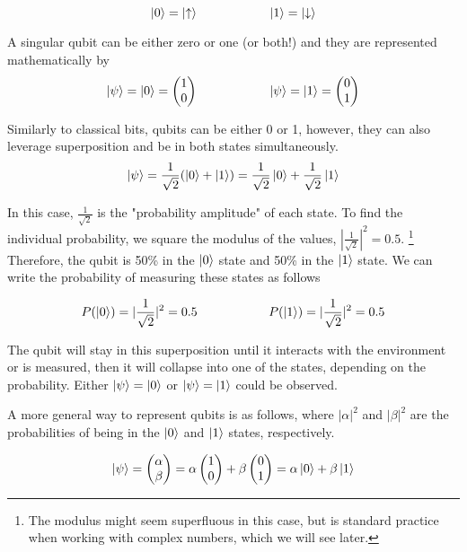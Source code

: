 \documentclass[12pt]{article}
\begin{document}
$$
\ket{0} = \ket{\uparrow} \hspace{2cm} \ket{1} = \ket{\downarrow}
$$


A singular qubit can be either zero or one (or both!) and they are represented mathematically by
$$
\ket{\psi} = \ket{0} = \begin{pmatrix} 1 \\ 0 \end{pmatrix} \hspace{2cm} \ket{\psi} = \ket{1} = \begin{pmatrix} 0 \\ 1 \end{pmatrix}
$$

Similarly to classical bits, qubits can be either 0 or 1, however, they can also leverage superposition and be in both states simultaneously.
$$
\ket{\psi} = \frac{1}{\sqrt{2}} (\ket{0} + \ket{1}) = \frac{1}{\sqrt{2}} \ket{0} + \frac{1}{\sqrt{2}}\ket{1}
$$

In this case, $\frac{1}{\sqrt{2}}$ is the "probability amplitude" of each state. To find the individual probability, we square the modulus of the values, $|\frac{1}{\sqrt{2}}|^2 = 0.5$. \footnote{The modulus might seem superfluous in this case, but is standard practice when working with complex numbers, which we will see later.} Therefore, the qubit is 50\% in the $\ket{0}$ state and 50\% in the $\ket{1}$ state. We can write the probability of measuring these states as follows

$$
P(\ket{0}) = |\frac{1}{\sqrt{2}}|^2 = 0.5 \hspace{2cm} P(\ket{1}) = |\frac{1}{\sqrt{2}}|^2 = 0.5 
$$

The qubit will stay in this superposition until it interacts with the environment or is measured, then it will collapse into one of the states, depending on the probability. Either $\ket{\psi} = \ket{0}$ or $\ket{\psi} =\ket{1}$ could be observed. 

A more general way to represent qubits is as follows, where $|\alpha|^2$ and $|\beta|^2$ are the probabilities of being in the $\ket{0}$ and $\ket{1}$ states, respectively.

$$
\ket{\psi} = 
\begin{pmatrix}
    \alpha \\
    \beta
\end{pmatrix} = 
\alpha \begin{pmatrix} 1 \\ 0 \end{pmatrix} + 
\beta \begin{pmatrix} 0 \\ 1 \end{pmatrix} =
\alpha\ket{0} + \beta\ket{1}
$$
\end{document}
